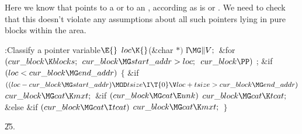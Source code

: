 Here we know that  points to a  or
to an , according as  is  or .
We need to check that
this doesn't violate any assumptions about all such pointers lying
in pure blocks within the  area.

\Y\B\4:Classify a pointer variable\X${}\E{}$\6
$\\{loc}\K{}$(\&{char} ${}{*}){}$ \|l${}\MG\|V;{}$\6
\&{for} ${}(\\{cur\_block}\K\\{blocks};{}$ ${}\\{cur\_block}\MG\\{start\_addr}>%
\\{loc};{}$ ${}\\{cur\_block}\PP){}$\1\5
;\2\6
\&{if} ${}(\\{loc}<\\{cur\_block}\MG\\{end\_addr}){}$\5
${}\{{}$\1\6
\&{if} ${}((\\{loc}-\\{cur\_block}\MG\\{start\_addr})\MOD\\{tsize}\I\T{0}\V%
\\{loc}+\\{tsize}>\\{cur\_block}\MG\\{end\_addr}){}$\1\5
${}\\{cur\_block}\MG\\{cat}\K\\{mxt};{}$\2\6
\&{if} ${}(\\{cur\_block}\MG\\{cat}\E\\{unk}){}$\1\5
${}\\{cur\_block}\MG\\{cat}\K\\{tcat};{}$\2\6
\&{else} \&{if} ${}(\\{cur\_block}\MG\\{cat}\I\\{tcat}){}$\1\5
${}\\{cur\_block}\MG\\{cat}\K\\{mxt};{}$\2\6
\4${}\}{}$\2\par
\U25.\fi

